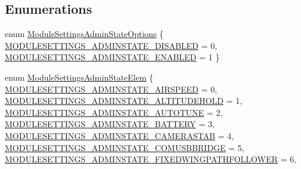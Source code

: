 \subsection*{\-Enumerations}
\begin{DoxyCompactItemize}
\item 
enum \hyperlink{group___module_settings_ga6bf61cf280308710aac054f1a40db55e}{\-Module\-Settings\-Admin\-State\-Options} \{ \hyperlink{group___module_settings_gga6bf61cf280308710aac054f1a40db55ea91e3ff2f1617b8a628b14ef2f90834af}{\-M\-O\-D\-U\-L\-E\-S\-E\-T\-T\-I\-N\-G\-S\-\_\-\-A\-D\-M\-I\-N\-S\-T\-A\-T\-E\-\_\-\-D\-I\-S\-A\-B\-L\-E\-D} = 0, 
\hyperlink{group___module_settings_gga6bf61cf280308710aac054f1a40db55eaef2fd3596bd27167e97e50be7584129a}{\-M\-O\-D\-U\-L\-E\-S\-E\-T\-T\-I\-N\-G\-S\-\_\-\-A\-D\-M\-I\-N\-S\-T\-A\-T\-E\-\_\-\-E\-N\-A\-B\-L\-E\-D} = 1
 \}
\item 
enum \hyperlink{group___module_settings_gaae8afa19b2ca814b325b800022055268}{\-Module\-Settings\-Admin\-State\-Elem} \{ \*
\hyperlink{group___module_settings_ggaae8afa19b2ca814b325b800022055268a26c4c8e5ec052eb8cca455aef78e608a}{\-M\-O\-D\-U\-L\-E\-S\-E\-T\-T\-I\-N\-G\-S\-\_\-\-A\-D\-M\-I\-N\-S\-T\-A\-T\-E\-\_\-\-A\-I\-R\-S\-P\-E\-E\-D} = 0, 
\hyperlink{group___module_settings_ggaae8afa19b2ca814b325b800022055268a422c3f906eaf65c00846896ef5200634}{\-M\-O\-D\-U\-L\-E\-S\-E\-T\-T\-I\-N\-G\-S\-\_\-\-A\-D\-M\-I\-N\-S\-T\-A\-T\-E\-\_\-\-A\-L\-T\-I\-T\-U\-D\-E\-H\-O\-L\-D} = 1, 
\hyperlink{group___module_settings_ggaae8afa19b2ca814b325b800022055268a4b027f0ff6e8ba90037e209f247cfffb}{\-M\-O\-D\-U\-L\-E\-S\-E\-T\-T\-I\-N\-G\-S\-\_\-\-A\-D\-M\-I\-N\-S\-T\-A\-T\-E\-\_\-\-A\-U\-T\-O\-T\-U\-N\-E} = 2, 
\hyperlink{group___module_settings_ggaae8afa19b2ca814b325b800022055268a6f1715638ae3b9305747df96b6a53ebd}{\-M\-O\-D\-U\-L\-E\-S\-E\-T\-T\-I\-N\-G\-S\-\_\-\-A\-D\-M\-I\-N\-S\-T\-A\-T\-E\-\_\-\-B\-A\-T\-T\-E\-R\-Y} = 3, 
\*
\hyperlink{group___module_settings_ggaae8afa19b2ca814b325b800022055268abe41ce2cf6c1ad0bb3fad3bcebf3bf7a}{\-M\-O\-D\-U\-L\-E\-S\-E\-T\-T\-I\-N\-G\-S\-\_\-\-A\-D\-M\-I\-N\-S\-T\-A\-T\-E\-\_\-\-C\-A\-M\-E\-R\-A\-S\-T\-A\-B} = 4, 
\hyperlink{group___module_settings_ggaae8afa19b2ca814b325b800022055268a31d35cbd171230e67a880542d751fe64}{\-M\-O\-D\-U\-L\-E\-S\-E\-T\-T\-I\-N\-G\-S\-\_\-\-A\-D\-M\-I\-N\-S\-T\-A\-T\-E\-\_\-\-C\-O\-M\-U\-S\-B\-B\-R\-I\-D\-G\-E} = 5, 
\hyperlink{group___module_settings_ggaae8afa19b2ca814b325b800022055268aa8c52f87bc8124178e532da3025e164c}{\-M\-O\-D\-U\-L\-E\-S\-E\-T\-T\-I\-N\-G\-S\-\_\-\-A\-D\-M\-I\-N\-S\-T\-A\-T\-E\-\_\-\-F\-I\-X\-E\-D\-W\-I\-N\-G\-P\-A\-T\-H\-F\-O\-L\-L\-O\-W\-E\-R} = 6, 

\end{DoxyCompactItemize}
